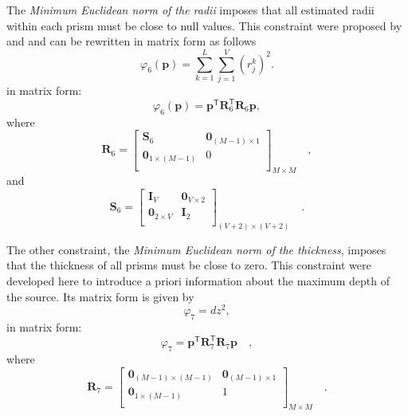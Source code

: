 The \textit{Minimum Euclidean norm of the radii} imposes that 
all estimated radii within each prism must be close to null values. This constraint were proposed by \cite{oliveirajr-etal2011} and \cite{oliveirajr-barbosa2013} and can be rewritten in matrix form as follows
\begin{equation}\label{eq:phi6}
\varphi_{6}(\textbf{p}) = \sum\limits^{L}_{k=1}\sum\limits^{V}_{j=1}\left(r_{j}^{k}\right)^2 .
\end{equation}
in matrix form:
\begin{equation}
\varphi_{6}(\mathbf{p}) = \mathbf{p}^{\mathsf{T}} \mathbf{R}_{6}^{\mathsf{T}} \mathbf{R}_{6} \mathbf{p},
\end{equation}
where
\begin{equation}
\mathbf{R}_{6} = 
\begin{bmatrix}
\mathbf{S}_{6} & \mathbf{0}_{(M-1) \times 1} \\
\mathbf{0}_{1 \times (M-1)} & 0 \\
\end{bmatrix}_{M\times M} \quad ,
\label{eq:R6-matrix}
\end{equation}
and 
\begin{equation}
\mathbf{S}_{6} = 
\begin{bmatrix}
\mathbf{I}_{V} & \mathbf{0}_{V \times 2} \\
\mathbf{0}_{2 \times V} & \mathbf{I}_{2} \\
\end{bmatrix}_{ (V+2)\times (V+2)} \quad .
\label{eq:S6-matrix}
\end{equation}

The other constraint, the \textit{Minimum Euclidean norm of the thickness}, imposes that the thickness of all prisms must be close to zero. This constraint were developed here to introduce a priori information about the maximum depth of the source. Its matrix form 
is given by
\begin{equation}
\varphi_7 = dz^2 ,
\end{equation}
in matrix form:
\begin{equation}
\varphi_7 = \mathbf{p}^{\mathsf{T}} \mathbf{R}_{7}^{\mathsf{T}} \mathbf{R}_{7} \mathbf{p} \quad ,
\label{eq:phi7}
\end{equation}
where
\begin{equation}
\mathbf{R}_{7} =
\begin{bmatrix}
\mathbf{0}_{(M-1) \times (M-1)} & \mathbf{0}_{(M-1) \times 1} \\
\mathbf{0}_{1 \times (M-1)} & 1 \\
\end{bmatrix}_{ M \times M } \quad .
\end{equation}

